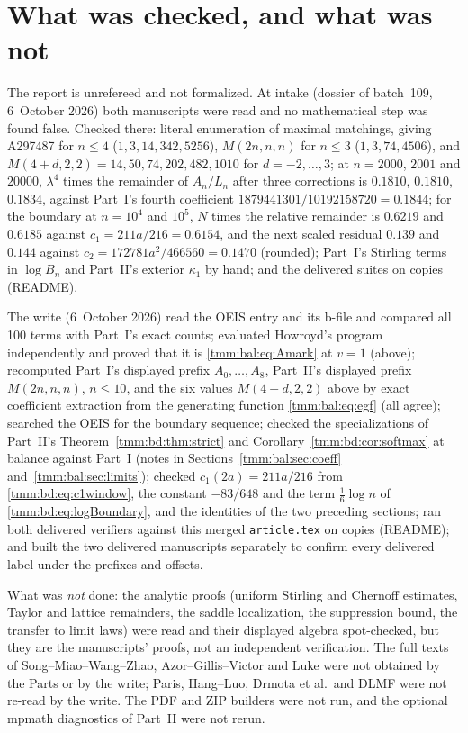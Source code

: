 \documentclass[11pt,letterpaper]{article}
\theoremstyle{remark}\newtheorem{remark}[theorem]{Remark}
\newcommand{\file}[1]{\nolinkurl{#1}}
\begin{document}
\section*{What was checked, and what was not}\label{tmm:sec:trust}
The report is unrefereed and not formalized. At intake (dossier of batch~109, 6~October 2026) both manuscripts were read and no mathematical step was found false. Checked there: literal enumeration of maximal matchings, giving A297487 for $n\le4$ ($1,3,14,342,5256$), $M(2n,n,n)$ for $n\le3$ ($1,3,74,4506$), and $M(4+d,2,2)=14,50,74,202,482,1010$ for $d=-2,\dots,3$; at $n=2000$, $2001$ and $20000$, $\lambda^4$ times the remainder of $A_n/L_n$ after three corrections is $0.1810$, $0.1810$, $0.1834$, against Part~I's fourth coefficient $1879441301/10192158720=0.1844$; for the boundary at $n=10^4$ and $10^5$, $N$ times the relative remainder is $0.6219$ and $0.6185$ against $c_1=211a/216=0.6154$, and the next scaled residual $0.139$ and $0.144$ against $c_2=172781a^2/466560=0.1470$ (rounded); Part~I's Stirling terms in $\log B_n$ and Part~II's exterior $\kappa_1$ by hand; and the delivered suites on copies (README).

The write (6~October 2026) read the OEIS entry and its b-file and compared all 100 terms with Part~I's exact counts; evaluated Howroyd's program independently and proved that it is \eqref{tmm:bal:eq:Amark} at $v=1$ (above); recomputed Part~I's displayed prefix $A_0,\dots,A_8$, Part~II's displayed prefix $M(2n,n,n)$, $n\le10$, and the six values $M(4+d,2,2)$ above by exact coefficient extraction from the generating function \eqref{tmm:bal:eq:egf} (all agree); searched the OEIS for the boundary sequence; checked the specializations of Part~II's Theorem~\ref{tmm:bd:thm:strict} and Corollary~\ref{tmm:bd:cor:softmax} at balance against Part~I (notes in Sections~\ref{tmm:bal:sec:coeff} and~\ref{tmm:bal:sec:limits}); checked $c_1(2a)=211a/216$ from \eqref{tmm:bd:eq:c1window}, the constant $-83/648$ and the term $\frac16\log n$ of \eqref{tmm:bd:eq:logBoundary}, and the identities of the two preceding sections; ran both delivered verifiers against this merged \file{article.tex} on copies (README); and built the two delivered manuscripts separately to confirm every delivered label under the prefixes and offsets.

What was \emph{not} done: the analytic proofs (uniform Stirling and Chernoff estimates, Taylor and lattice remainders, the saddle localization, the suppression bound, the transfer to limit laws) were read and their displayed algebra spot-checked, but they are the manuscripts' proofs, not an independent verification. The full texts of Song--Miao--Wang--Zhao, Azor--Gillis--Victor and Luke were not obtained by the Parts or by the write; Paris, Hang--Luo, Drmota et al.\ and DLMF were not re-read by the write. The PDF and ZIP builders were not run, and the optional mpmath diagnostics of Part~II were not rerun.
\end{document}
